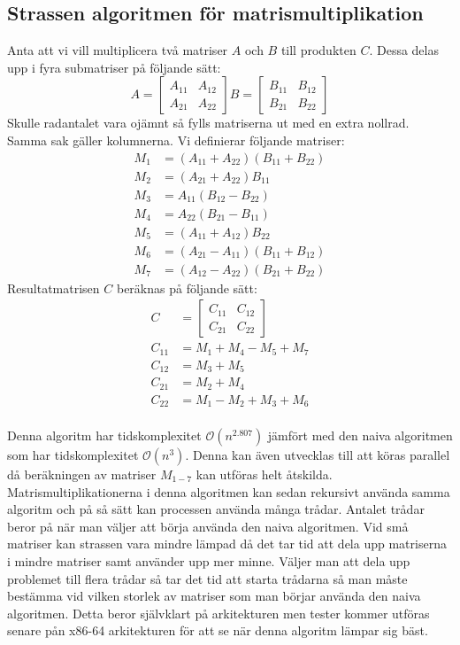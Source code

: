 \subsection{Strassen algoritmen för matrismultiplikation}
\label{sec:strassen}
Anta att vi vill multiplicera två matriser $A$ och $B$ till produkten $C$. Dessa delas upp i fyra submatriser på följande sätt:
 $$A=\begin{bmatrix}
A_{11} & A_{12} \\
A_{21}& A_{22}
 \end{bmatrix}
 B=\begin{bmatrix}
B_{11} & B_{12} \\
B_{21}& B_{22}
 \end{bmatrix}
 $$
 Skulle radantalet vara ojämnt så fylls matriserna ut med en extra nollrad. Samma sak gäller kolumnerna.
 Vi definierar följande matriser:
  \begin{align}
  M_1 & =(A_{11}+A_{22})(B_{11}+B_{22}) \\
  M_2 & =(A_{21}+A_{22})B_{11} \\
  M_3 & =A_{11}(B_{12}-B_{22}) \\
  M_4 & =A_{22}(B_{21}-B_{11}) \\
  M_5 & =(A_{11}+A_{12})B_{22} \\
  M_6 & =(A_{21}-A_{11})(B_{11}+B_{12}) \\
  M_7 & =(A_{12}-A_{22})(B_{21}+B_{22}) 
 \end{align}
 Resultatmatrisen $C$ beräknas på följande sätt:
   \begin{align}
    C & =\begin{bmatrix}
C_{11} & C_{12} \\
C_{21}& C_{22}
 \end{bmatrix} \\
  C_{11} & =M_1+M_4-M_5+M_7 \\
  C_{12} & = M_3+M_5 \\
  C_{21} & = M_2+M_4 \\
  C_{22} & = M_1-M_2+M_3+M_6
 \end{align}
 \\
Denna algoritm har tidskomplexitet $\mathcal{O}(n^{2.807})$ jämfört med den naiva algoritmen som har tidskomplexitet $\mathcal{O}(n^{3})$. Denna kan även utvecklas till att köras parallel då beräkningen av matriser $M_{1-7}$ kan utföras helt åtskilda. Matrismultiplikationerna i denna algoritmen kan sedan rekursivt använda samma algoritm och på så sätt kan processen använda många trådar. Antalet trådar beror på när man väljer att börja använda den naiva algoritmen. Vid små matriser kan strassen vara mindre lämpad då det tar tid att dela upp matriserna i mindre matriser samt använder upp mer minne. Väljer man att dela upp problemet till flera trådar så tar det tid att starta trådarna så man måste bestämma vid vilken storlek av matriser som man börjar använda den naiva algoritmen. Detta beror självklart på arkitekturen men tester kommer utföras senare pån x86-64 arkitekturen för att se när denna algoritm lämpar sig bäst. 
